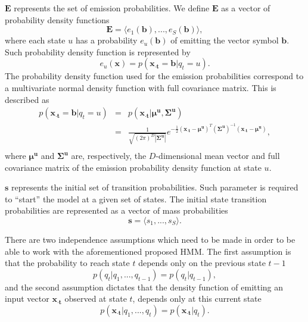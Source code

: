 $\mathbf{E}$ represents the set of emission probabilities. We define $\mathbf{E}$ as a vector of probability density functions
\begin{equation}
  \label{eq:hmm.e}
  \mathbf{E} = \langle e_1(\mathbf{b}), ..., e_S(\mathbf{b}) \rangle,
\end{equation}
where each state $u$ has a probability $e_u(\mathbf{b})$ of emitting the vector symbol $ \mathbf{b} $. Such probability density function is represented by
\begin{equation}
  \label{eq:hmm.emission}
  e_u(\mathbf{x}) = p(\mathbf{{x}_{\cdot t}} = \mathbf{b} | q_t = u).
\end{equation}
The probability density function used for the emission probabilities correspond to a multivariate normal density function with full covariance matrix. This is described as
\begin{equation}
  \label{eq:hmm.emission.gaussian}
  \begin{array}{lcl}
    p(\mathbf{{x}_{\cdot t}} = \mathbf{b} | q_t = u) & = & 
    p(\mathbf{x_{\cdot t}}|{{\boldsymbol\mu}^{\mathbf{u}}},{{\boldsymbol\Sigma}^{\mathbf{u}}})\\[0.4em] & = &
    \frac{1}{ \sqrt{(2\pi)^{D} {| {{\boldsymbol\Sigma}^{\mathbf{u}}} |}}}
    e^{-\frac{1}{2} (\mathbf{x_{\cdot t}}-{{\boldsymbol\mu}^{\mathbf{u}}})^T ({{\boldsymbol\Sigma}^{\mathbf{u}}})^{-1} (\mathbf{x_{\cdot t}}-{{\boldsymbol\mu}^{\mathbf{u}}})}, \\
  \end{array}
\end{equation}
where ${{\boldsymbol\mu}^{\mathbf{u}}}$ and ${{\boldsymbol\Sigma}^{\mathbf{u}}}$ are, respectively, the $D$-dimensional mean vector and full covariance matrix of the emission probability density function at state $u$.

$\mathbf{s}$ represents the initial set of transition probabilities. Such parameter is required to ``start'' the model at a given set of states. The initial state transition probabilities are represented as a vector of mass probabilities
\begin{equation}
  \label{eq:hmm.initial}
  \mathbf{s} = \langle s_{1}, ..., s_{S} \rangle.
\end{equation}

There are two independence assumptions which need to be made in order to be able to work with the aforementioned proposed HMM. The first assumption is that the probability to reach state $t$ depends only on the previous state $t-1$
\begin{equation}
  \label{eq:hmm.indep.1}
  p(q_t | q_1, ..., q_{t-1}) = p(q_t | q_{t-1}),
\end{equation}
and the second assumption dictates that the density function of emitting an input vector $\mathbf{{x}_{\cdot t}}$ observed at state $t$, depends only at this current state
\begin{equation}
  \label{eq:hmm.indep.2}
  p(\mathbf{{x}_{\cdot t}} | q_1, ..., q_t) = p(\mathbf{{x}_{\cdot t}} | q_t).
\end{equation}

